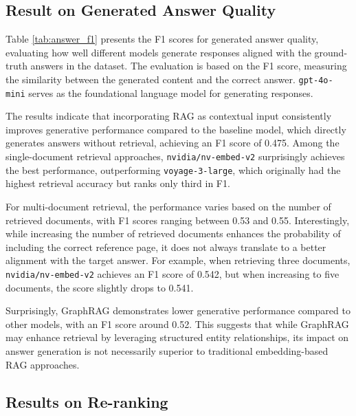 \documentclass[runningheads]{llncs}
\begin{document}

\subsection{Result on Generated Answer Quality}

Table \ref{tab:answer_f1} presents the F1 scores for generated answer quality, evaluating how well different models generate responses aligned with the ground-truth answers in the dataset. The evaluation is based on the F1 score, measuring the similarity between the generated content and the correct answer. \texttt{gpt-4o-mini} serves as the foundational language model for generating responses.

The results indicate that incorporating RAG as contextual input consistently improves generative performance compared to the baseline model, which directly generates answers without retrieval, achieving an F1 score of 0.475. Among the single-document retrieval approaches, \texttt{nvidia/nv-embed-v2} surprisingly achieves the best performance, outperforming \texttt{voyage-3-large}, which originally had the highest retrieval accuracy but ranks only third in F1.

For multi-document retrieval, the performance varies based on the number of retrieved documents, with F1 scores ranging between 0.53 and 0.55. Interestingly, while increasing the number of retrieved documents enhances the probability of including the correct reference page, it does not always translate to a better alignment with the target answer. For example, when retrieving three documents, \texttt{nvidia/nv-embed-v2} achieves an F1 score of 0.542, but when increasing to five documents, the score slightly drops to 0.541.

Surprisingly, GraphRAG demonstrates lower generative performance compared to other models, with an F1 score around 0.52. This suggests that while GraphRAG may enhance retrieval by leveraging structured entity relationships, its impact on answer generation is not necessarily superior to traditional embedding-based RAG approaches.


\subsection{Results on Re-ranking}
\end{document}

